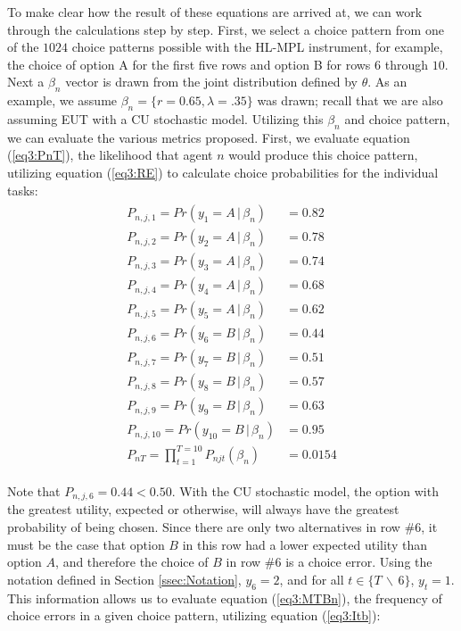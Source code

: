 \documentclass[../main.tex]{subfiles}
\begin{document}
To make clear how the result of these equations are arrived at, we can work through the calculations step by step.
First, we select a choice pattern from one of the $1024$ choice patterns possible with the HL-MPL instrument, for example, the choice of option A for the first five rows and option B for rows $6$ through $10$.
Next a $\beta_n$ vector is drawn from the joint distribution defined by $\theta$.
As an example, we assume $\beta_n = \lbrace r = 0.65, \lambda = .35\rbrace$ was drawn; recall that we are also assuming EUT with a CU stochastic model.
Utilizing this $\beta_n$ and choice pattern, we can evaluate the various metrics proposed.
First, we evaluate equation (\ref{eq3:PnT}), the likelihood that agent $n$ would produce this choice pattern, utilizing equation (\ref{eq3:RE}) to calculate choice probabilities for the individual tasks:
\begin{align}
	\label{eq3:example_PnT}
	\begin{split}
		P_{n,j,1}  = Pr(y_1 = A    \,|\, \beta_n)    &= 0.82 \\
		P_{n,j,2}  = Pr(y_2 = A    \,|\, \beta_n)    &= 0.78 \\
		P_{n,j,3}  = Pr(y_3 = A    \,|\, \beta_n)    &= 0.74 \\
		P_{n,j,4}  = Pr(y_4 = A    \,|\, \beta_n)    &= 0.68 \\
		P_{n,j,5}  = Pr(y_5 = A    \,|\, \beta_n)    &= 0.62 \\
		P_{n,j,6}  = Pr(y_6 = B    \,|\, \beta_n)    &= 0.44 \\
		P_{n,j,7}  = Pr(y_7 = B    \,|\, \beta_n)    &= 0.51 \\
		P_{n,j,8}  = Pr(y_8 = B    \,|\, \beta_n)    &= 0.57 \\
		P_{n,j,9}  = Pr(y_9 = B    \,|\, \beta_n)    &= 0.63 \\
		P_{n,j,10} = Pr(y_{10} = B \,|\, \beta_n)    &= 0.95 \\
		P_{nT}     = \prod_{t = 1}^{T = 10} P_{njt}(\beta_n)  &= 0.0154
	\end{split}
\end{align}

\noindent Note that $P_{n,j,6} = 0.44 < 0.50$.
With the CU stochastic model, the option with the greatest utility, expected or otherwise, will always have the greatest probability of being chosen.
Since there are only two alternatives in row \#6, it must be the case that option $B$ in this row had a lower expected utility than option $A$, and therefore the choice of $B$ in row \#6 is a choice error.
Using the notation defined in Section \ref{ssec:Notation}, $y_6 = 2$, and for all $t \in \lbrace T \,\backslash\, 6 \rbrace$, $y_t = 1$.
This information allows us to evaluate equation (\ref{eq3:MTBn}), the frequency of choice errors in a given choice pattern, utilizing equation (\ref{eq3:Itb}):
\end{document}
